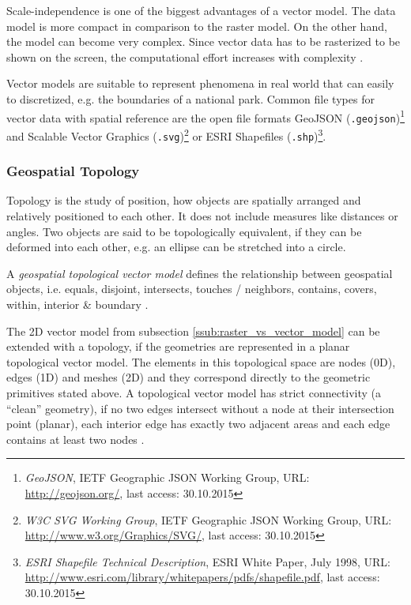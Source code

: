 Scale-independence is one of the biggest advantages of a vector model. The data model is more compact in comparison to the raster model. On the other hand, the model can become very complex. Since vector data has to be rasterized to be shown on the screen, the computational effort increases with complexity \cite[pp.33-42]{bolstad2008gis}.

Vector models are suitable to represent phenomena in real world that can easily to discretized, e.g. the boundaries of a national park. Common file types for vector data with spatial reference are the open file formats GeoJSON (\texttt{.geojson})\footnote{
  \textit{GeoJSON},
  IETF Geographic JSON Working Group,
  URL: \url{http://geojson.org/},
  last access: 30.10.2015
}
and Scalable Vector Graphics (\texttt{.svg})\footnote{
  \textit{W3C SVG Working Group},
  IETF Geographic JSON Working Group,
  URL: \url{http://www.w3.org/Graphics/SVG/},
  last access: 30.10.2015
}
or ESRI Shapefiles (\texttt{.shp})\footnote{
  \textit{ESRI Shapefile Technical Description},
  ESRI White Paper, July 1998,
  URL: \url{http://www.esri.com/library/whitepapers/pdfs/shapefile.pdf},
  last access: 30.10.2015
}.



\subsubsection{Geospatial Topology} %
\label{ssub:geospatial_topology}

Topology is the study of position, how objects are spatially arranged and relatively positioned to each other. It does not include measures like distances or angles. Two objects are said to be topologically equivalent, if they can be deformed into each other, e.g. an ellipse can be stretched into a circle.

A \emph{geospatial topological vector model} defines the relationship between geospatial objects, i.e. equals, disjoint, intersects, touches / neighbors, contains, covers, within, interior \& boundary
\cite{clementiniTopology}.

The 2D vector model from subsection \ref{ssub:raster_vs_vector_model} can be extended with a topology, if the geometries are represented in a planar topological vector model. The elements in this topological space are nodes (0D), edges (1D) and meshes (2D) and they correspond directly to the geometric primitives stated above. A topological vector model has strict connectivity (a ``clean'' geometry), if no two edges intersect without a node at their intersection point (planar), each interior edge has exactly two adjacent areas and each edge contains at least two nodes
\cite[pp.37-39]{bolstad2008gis}.

